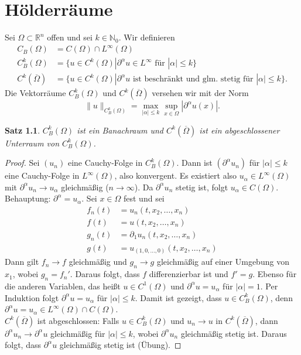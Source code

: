 \documentclass[
paper=a4,
bibtotocnumbered,
liststotocnumbered,
tablecaptionabove,
pointlessnumbers,
twoside,
openright,
10pt
]
{report}
\newtheorem{satz}[thm]{Satz}
\theoremstyle{definition}
\numberwithin{equation}{chapter}
\begin{document}
\chapter{Hölderräume}
Sei $\Omega \subset \mathbb R^n$ offen und sei $k\in \mathbb N_0$. Wir definieren
\begin{align*}
C_B(\Omega) &= C(\Omega) \cap L^\infty (\Omega)\\
C_B^k(\Omega) &= \{u\in C^k(\Omega) |\partial^\alpha u\in L^\infty \text{ für } |\alpha|\le k\}\\
C^k(\overline{\Omega}) &= \{u\in C^k(\Omega) |\partial^\alpha u \text{ ist beschränkt und glm. stetig für } |\alpha|\le k\}.
\end{align*}
Die Vektorräume $C_B^k(\Omega)$ und $C^k(\overline{\Omega})$ versehen wir mit der Norm
\begin{equation}
\|u\|_{C_B^k(\Omega)} = \max_{|\alpha|\le k} \sup_{x\in \Omega} |\partial^\alpha u(x)|.
\end{equation}
\begin{satz}
$C_B^k(\Omega)$ ist ein Banachraum und $C^k(\overline{\Omega})$ ist ein abgeschlossener Unterraum von $C_B^k(\Omega)$.
\end{satz}
\begin{proof}
Sei $(u_n)$ eine Cauchy-Folge in $C_B^k(\Omega)$. Dann ist $(\partial^\alpha u_n)$ für $|\alpha| \leq k$ eine Cauchy-Folge in $L^\infty(\Omega)$, also konvergent. Es existiert also $u_\alpha\in L^\infty(\Omega)$ mit $\partial^\alpha u_n \rightarrow u_\alpha$ gleichmäßig ($n\rightarrow\infty$). Da $\partial^\alpha u_n$ stetig ist, folgt $u_\alpha\in C(\Omega)$. Behauptung: $\partial^\alpha=u_\alpha$. Sei $x\in\Omega$ fest und sei
\begin{align*}
f_n(t)&=u_n(t,x_2,\ldots,x_n) \\
f(t)&=u(t,x_2,\ldots,x_n) \\
g_n(t)&=\partial_1 u_n(t,x_2,\ldots,x_n) \\
g(t)&=u_{(1,0,\ldots,0)}(t,x_2,\ldots,x_n)
\end{align*}
Dann gilt $f_n\rightarrow f$ gleichmäßig und $g_n\rightarrow g$ gleichmäßig auf einer Umgebung von $x_1$, wobei $g_n=f_n'$. Daraus folgt, dass $f$ differenzierbar ist und $f'=g$. Ebenso für die anderen Variablen, das heißt $u\in C^1(\Omega)$ und $\partial^\alpha u=u_\alpha$ für $|\alpha|=1$. Per Induktion folgt $\partial^\alpha u=u_\alpha$ für $|\alpha|\leq k$. Damit ist gezeigt, dass $u\in C_B^k(\Omega)$, denn $\partial^\alpha u=u_\alpha \in L^\infty(\Omega)\cap C(\Omega)$. \\
$C^k(\overline{\Omega})$ ist abgeschlossen: Falls $u\in C_B^k(\Omega)$ und $u_n\rightarrow u$ in $C^k(\overline{\Omega})$, dann $\partial^\alpha u_n \rightarrow \partial^\alpha u$ gleichmäßig für $|\alpha|\leq k$, wobei $\partial^\alpha u_n$ gleichmäßig stetig ist. Daraus folgt, dass $\partial^\alpha u$ gleichmäßig stetig ist (Übung).
\end{proof}
\end{document}
